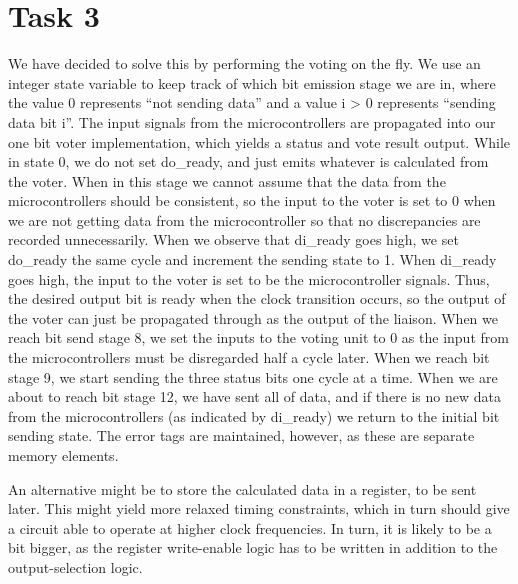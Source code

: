 \documentclass[11pt]{article}
\begin{document}
\section{Task 3}
\label{sec:task3}

We have decided to solve this by performing the voting on the fly. We
use an integer state variable to keep track of which bit emission
stage we are in, where the value 0 represents ``not sending data'' and
a value i > 0 represents ``sending data bit i''. The input signals
from the microcontrollers are propagated into our one bit voter
implementation, which yields a status and vote result output. While in
state 0, we do not set do\_ready, and just emits whatever is
calculated from the voter. When in this stage we cannot assume that
the data from the microcontrollers should be consistent, so the input
to the voter is set to 0 when we are not getting data from the
microcontroller so that no discrepancies are recorded
unnecessarily. When we observe that di\_ready goes high, we set
do\_ready the same cycle and increment the sending state to 1. When
di\_ready goes high, the input to the voter is set to be the
microcontroller signals. Thus, the desired output bit is ready when
the clock transition occurs, so the output of the voter can just be
propagated through as the output of the liaison. When we reach bit
send stage 8, we set the inputs to the voting unit to 0 as the input
from the microcontrollers must be disregarded half a cycle later. When
we reach bit stage 9, we start sending the three status bits one cycle
at a time. When we are about to reach bit stage 12, we have sent all
of data, and if there is no new data from the microcontrollers (as
indicated by di\_ready) we return to the initial bit sending
state. The error tags are maintained, however, as these are separate
memory elements.

An alternative might be to store the calculated data in a register, to
be sent later. This might yield more relaxed timing constraints, which
in turn should give a circuit able to operate at higher clock
frequencies. In turn, it is likely to be a bit bigger, as the register
write-enable logic has to be written in addition to the
output-selection logic.
\end{document}
